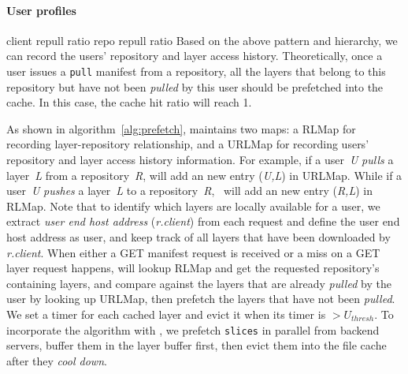 \paragraph{User profiles}
client repull ratio
repo repull ratio
Based on the above 
pattern and hierarchy, we can record the users' repository and layer access history. 
Theoretically, once a user issues a \texttt{pull} manifest from a repository, all the layers that belong to this repository but have not been \emph{pulled} by this user should be prefetched into the cache.
In this case, the cache hit ratio will reach 1.

As shown in algorithm~\ref{alg:prefetch}, \sysname maintains two maps: a RLMap for recording layer-repository
relationship, and 
a URLMap for recording 
users' repository and layer access history information. 
For example, if a user~\emph{U} \emph{pulls} a layer~\emph{L} from a repository~\emph{R},
\sysname will add an new entry (\emph{U,L}) in URLMap.
While if a user~\emph{U} \emph{pushes} a  layer~\emph{L} to a repository~\emph{R},
\sysname~will add an new entry (\emph{R,L}) in RLMap. 
Note that to identify which layers are locally available for a user, 
we extract \emph{user end host address} (\emph{r.client}) 
from each request and define the user end host address as user,
and keep track of all layers that have been downloaded by \emph{r.client}. 
When either a GET manifest request is received or 
a miss on a GET layer request happens,
\sysname will lookup RLMap and get the requested repository's containing layers,
and compare against the layers that are already \emph{pulled} by the user by looking up URLMap,
then prefetch the layers that have not been \emph{pulled}. 
We set a timer for each cached layer and evict it when its timer is $>U_{thresh}$.
To incorporate the algorithm with \sysname,
we prefetch \texttt{slices} in parallel from backend servers,  
buffer them in the layer buffer first, then evict them into the file cache after they \emph{cool down}.


